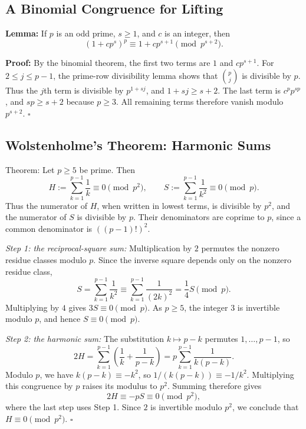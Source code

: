 \documentclass[a4paper,11pt,abstracton]{scrartcl}
\theoremstyle{dotlessP}
\theoremstyle{dotlessS}
\theoremstyle{remark}
\theoremstyle{definition}
\begin{document}
\subsection{A Binomial Congruence for Lifting}
\label{subsec:binomial-lifting}

\begin{remark_box}
\textbf{Lemma:}
If $p$ is an odd prime, $s\geq1$, and $c$ is an integer, then
\[
    (1+cp^s)^p\equiv1+cp^{s+1}\pmod{p^{s+2}}.
\]
\end{remark_box}

\textbf{Proof:}
By the binomial theorem, the first two terms are $1$ and $cp^{s+1}$.
For $2\leq j\leq p-1$, the prime-row divisibility lemma shows that
$\binom pj$ is divisible by $p$. Thus the $j$th term is divisible by
$p^{1+sj}$, and $1+sj\geq s+2$.
The last term is $c^p p^{sp}$, and $sp\geq s+2$ because $p\geq3$.
All remaining terms therefore vanish modulo $p^{s+2}$.
\hfill$\square$

\subsection{Wolstenholme's Theorem: Harmonic Sums}

\begin{mainbox}{Theorem:}
Let $p\geq5$ be prime. Then
\[
    \boxed{H:=\sum_{k=1}^{p-1}\frac1k\equiv0\pmod{p^2},}
    \qquad
    S:=\sum_{k=1}^{p-1}\frac1{k^2}\equiv0\pmod p.
\]
Thus the numerator of $H$, when written in lowest terms, is divisible
by $p^2$, and the numerator of $S$ is divisible by $p$.
Their denominators are coprime to $p$, since a common denominator is
$((p-1)!)^2$.
\end{mainbox}

\textit{Step 1: the reciprocal-square sum:}
Multiplication by $2$ permutes the nonzero residue classes modulo $p$.
Since the inverse square depends only on the nonzero residue class,
\[
    S=\sum_{k=1}^{p-1}\frac1{k^2}
      \equiv\sum_{k=1}^{p-1}\frac1{(2k)^2}
      =\frac14 S\pmod p.
\]
Multiplying by $4$ gives $3S\equiv0\pmod p$.
As $p\geq5$, the integer $3$ is invertible modulo $p$, and hence
$S\equiv0\pmod p$.

\textit{Step 2: the harmonic sum:}
The substitution $k\mapsto p-k$ permutes $1,\ldots,p-1$, so
\[
    2H=\sum_{k=1}^{p-1}\left(\frac1k+\frac1{p-k}\right)
       =p\sum_{k=1}^{p-1}\frac1{k(p-k)}.
\]
Modulo $p$, we have $k(p-k)\equiv-k^2$, so
$1/(k(p-k))\equiv-1/k^2$. Multiplying this congruence by $p$
raises its modulus to $p^2$. Summing therefore gives
\[
    2H\equiv-pS\equiv0\pmod{p^2},
\]
where the last step uses Step 1. Since $2$ is invertible modulo $p^2$,
we conclude that $H\equiv0\pmod{p^2}$.
\hfill$\square$
\end{document}
